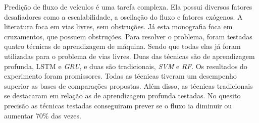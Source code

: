 Predição de fluxo de veículos é uma tarefa complexa. Ela possui diversos fatores desafiadores como a escalabilidade, a oscilação do fluxo e fatores exógenos. A literatura foca em vias livres, sem obstruções. Já esta monografia foca em cruzamentos, que possuem obstruções. Para resolver o problema, foram testadas quatro técnicas de aprendizagem de máquina. Sendo que todas elas já foram utilizadas para o problema de vias livres. Duas das técnicas são de aprendizagem profunda, \acrfull{LSTM} e \textit{\acrfull{GRU}}, e duas são tradicionais, \textit{\acrfull{SVM}} e \textit{\acrfull{RF}}. Os resultados do experimento foram promissores. Todas as técnicas tiveram um desempenho superior as bases de comparações propostas. Além disso, as técnicas tradicionais se destacaram em relação as de aprendizagem profunda testadas. No quesito precisão as técnicas testadas conseguiram prever se o fluxo ia diminuir ou aumentar 70\% das vezes.
